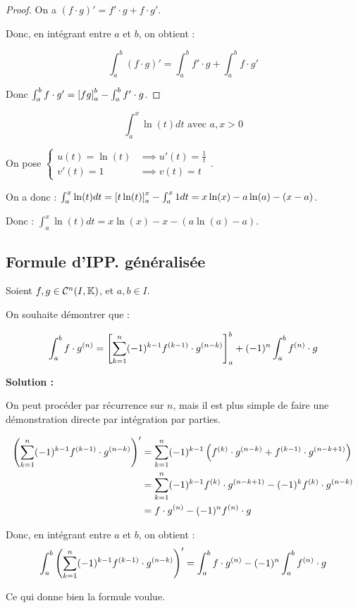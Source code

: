 \documentclass[12pt, a4paper]{report}
\begin{document}
\begin{proof}
    On a $(f \cdot g)' = f' \cdot g + f \cdot g'$.

    Donc, en intégrant entre $a$ et $b$, on obtient :

    $$\int_a^b (f \cdot g)' = \int_a^b f' \cdot g + \int_a^b f \cdot g'$$

    Donc $\int_a^b f\cdot g' = \left[fg\right]_a^b - \int_a^b f'\cdot g$.
\end{proof}

\begin{example}
    $$\int_a^x \ln(t) dt \text{ avec } a,x > 0$$

    On pose $\begin{cases} u(t) = \ln(t) &\implies u'(t) = \frac{1}{t} \\ v'(t) = 1 &\implies v(t) = t \end{cases}$.

    On a donc : $\int_a^x \ln(t) dt = \left[t\ln(t)\right]_a^x - \int_a^x 1 dt = x\ln(x) - a\ln(a) - (x-a)$.

    Donc : $\int_a^x \ln(t) dt = x\ln(x) - x - (a\ln(a) - a)$.
\end{example}

\subsection{Formule d'IPP. généralisée}

\begin{exercise}
    Soient $f,g\in\mathcal{C}^n(I,\mathbb{K})$, et $a,b\in I$.

    On souhaite démontrer que :

    $$\int_a^b f\cdot g^{(n)}=\left[\sum_{k=1}^n (-1)^{k-1} f^{(k-1)}\cdot g^{(n-k)}\right]_a^b + (-1)^n \int_a^b f^{(n)}\cdot g$$

    \textbf{Solution :}

    On peut procéder par récurrence sur $n$, mais il est plus simple de faire une démonstration directe par intégration par parties.

    \begin{align*}
        \left(\sum_{k=1}^n (-1)^{k-1} f^{(k-1)}\cdot g^{(n-k)}\right)' &= \sum_{k=1}^n (-1)^{k-1} \left(f^{(k)}\cdot g^{(n-k)} + f^{(k-1)}\cdot g^{(n-k+1)}\right) \\
        &= \sum_{k=1}^n (-1)^{k-1} f^{(k)}\cdot g^{(n-k+1)} - (-1)^k f^{(k)}\cdot g^{(n-k)} \\
        &= f\cdot g^{(n)} - (-1)^n f^{(n)}\cdot g
    \end{align*}

    Donc, en intégrant entre $a$ et $b$, on obtient :
    $$\int_a^b \left(\sum_{k=1}^n (-1)^{k-1} f^{(k-1)}\cdot g^{(n-k)}\right)' = \int_a^b f\cdot g^{(n)} - (-1)^n \int_a^b f^{(n)}\cdot g$$

    Ce qui donne bien la formule voulue.
\end{exercise}
\end{document}
